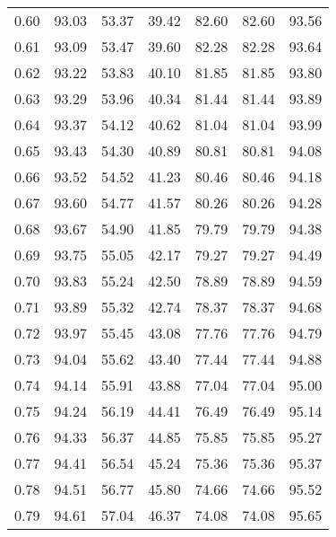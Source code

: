 \begin{tabular}{|c|c|c|c|c|c|c|}
      0.60 &     93.03 &     53.37 &      39.42 &   82.60 &      82.60 &         93.56 \\
      0.61 &     93.09 &     53.47 &      39.60 &   82.28 &      82.28 &         93.64 \\
      0.62 &     93.22 &     53.83 &      40.10 &   81.85 &      81.85 &         93.80 \\
      0.63 &     93.29 &     53.96 &      40.34 &   81.44 &      81.44 &         93.89 \\
      0.64 &     93.37 &     54.12 &      40.62 &   81.04 &      81.04 &         93.99 \\
      0.65 &     93.43 &     54.30 &      40.89 &   80.81 &      80.81 &         94.08 \\
      0.66 &     93.52 &     54.52 &      41.23 &   80.46 &      80.46 &         94.18 \\
      0.67 &     93.60 &     54.77 &      41.57 &   80.26 &      80.26 &         94.28 \\
      0.68 &     93.67 &     54.90 &      41.85 &   79.79 &      79.79 &         94.38 \\
      0.69 &     93.75 &     55.05 &      42.17 &   79.27 &      79.27 &         94.49 \\
      0.70 &     93.83 &     55.24 &      42.50 &   78.89 &      78.89 &         94.59 \\
      0.71 &     93.89 &     55.32 &      42.74 &   78.37 &      78.37 &         94.68 \\
      0.72 &     93.97 &     55.45 &      43.08 &   77.76 &      77.76 &         94.79 \\
      0.73 &     94.04 &     55.62 &      43.40 &   77.44 &      77.44 &         94.88 \\
      0.74 &     94.14 &     55.91 &      43.88 &   77.04 &      77.04 &         95.00 \\
      0.75 &     94.24 &     56.19 &      44.41 &   76.49 &      76.49 &         95.14 \\
      0.76 &     94.33 &     56.37 &      44.85 &   75.85 &      75.85 &         95.27 \\
      0.77 &     94.41 &     56.54 &      45.24 &   75.36 &      75.36 &         95.37 \\
      0.78 &     94.51 &     56.77 &      45.80 &   74.66 &      74.66 &         95.52 \\
      0.79 &     94.61 &     57.04 &      46.37 &   74.08 &      74.08 &         95.65 \\

\end{tabular}
